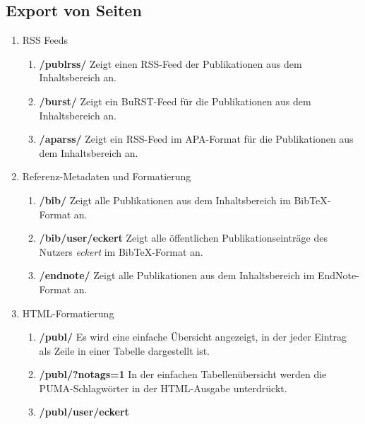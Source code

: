 \subsection{Export von Seiten}
\label{exportSeite}
\begin{enumerate}
    \item RSS Feeds
    \begin{enumerate}
        \item \textbf{/publrss/} \newline
        Zeigt einen RSS-Feed der Publikationen aus dem Inhaltsbereich an.
        \item \textbf{/burst/} \newline
        Zeigt ein BuRST-Feed für die Publikationen aus dem Inhaltsbereich an.
        \item \textbf{/aparss/} \newline
        Zeigt ein RSS-Feed im APA-Format für die Publikationen aus dem Inhaltsbereich an.
    \end{enumerate}
    \item Referenz-Metadaten und Formatierung
    \begin{enumerate}
        \item \textbf{/bib/} \newline
        Zeigt alle Publikationen aus dem Inhaltsbereich im BibTeX-Format an.
        \item \textbf{/bib/user/eckert} \newline
        Zeigt alle öffentlichen Publikationseinträge des Nutzers \textit{eckert} im BibTeX-Format an.
        \item \textbf{/endnote/} \newline
        Zeigt alle Publikationen aus dem Inhaltsbereich im EndNote-Format an.
    \end{enumerate}
    \item HTML-Formatierung
    \begin{enumerate}
        \item \textbf{ /publ/} \newline
        Es wird eine einfache Übersicht angezeigt, in der jeder Eintrag als Zeile in einer Tabelle dargestellt ist.
        \item \textbf{/publ/?notags=1} \newline
        In der einfachen Tabellenübersicht werden die PUMA-Schlagwörter in der HTML-Ausgabe unterdrückt.
        \item \textbf{/publ/user/eckert} \newline

\end{enumerate}
\end{enumerate}
